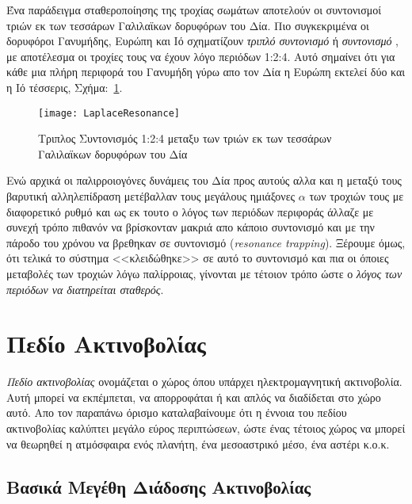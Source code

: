 \newpage

Ένα παράδειγμα σταθεροποίησης της τροχίας σωμάτων αποτελούν οι συντονισμοί τριών εκ των τεσσάρων Γαλιλαϊκων δορυφόρων του Δία. Πιο συγκεκριμένα οι δορυφόροι Γανυμήδης, Ευρώπη και Ιό σχηματίζουν {\it τριπλό συντονισμό} ή {\it συντονισμό} {}, με αποτέλεσμα οι τροχίες τους να έχουν λόγο περιόδων 1:2:4. Αυτό σημαίνει ότι για κάθε μια πλήρη περιφορά του Γανυμήδη γύρω απο τον Δία η Ευρώπη εκτελεί δύο και η Ιό τέσσερις, Σχήμα:~\ref{fig:LaplaceResonance}.

\begin{figure}[h!]
  \centering
  \texttt{[image: LaplaceResonance]}
  \gr
  \caption{Τριπλος Συντονισμός 1:2:4 μεταξυ των τριών εκ των τεσσάρων Γαλιλαϊκων δορυφόρων του Δία }\label{fig:LaplaceResonance}
\end{figure}

Ενώ αρχικά οι παλιρροιογόνες δυνάμεις του Δία προς αυτούς αλλα και η μεταξύ τους βαρυτική αλληλεπίδραση μετέβαλλαν τους μεγάλους ημιάξονες $\alpha$  των τροχιών τους με διαφορετικό ρυθμό και ως εκ τουτο ο λόγος των περιόδων περιφοράς άλλαζε με συνεχή τρόπο πιθανόν να βρίσκονταν μακριά απο κάποιο συντονισμό και με την πάροδο του χρόνου να βρεθηκαν σε συντονισμό {\en({\it resonance trapping})}. Ξέρουμε όμως\cite[{\en Chap.~1, Sect.~1.8}]{tausigmaiotagammaacutealphanuetavarsigma2015pilambdaalphanuetatauiotakappaacutealpha}, ότι τελικά το σύστημα <<κλειδώθηκε>> σε αυτό το συντονισμό και πια οι όποιες μεταβολές των τροχιών λόγω παλίρροιας, γίνονται με τέτοιον τρόπο ώστε ο {\it λόγος των περιόδων να διατηρείται σταθερός}.
 


\newpage
\section{Πεδίο Ακτινοβολίας}

{\it Πεδίο ακτινοβολίας} ονομάζεται ο χώρος όπου υπάρχει ηλεκτρομαγνητική ακτινοβολία. Αυτή μπορεί να εκπέμπεται, να απορροφάται ή και απλός να διαδίδεται στο χώρο αυτό. Απο τον παραπάνω όρισμο καταλαβαίνουμε ότι η έννοια του πεδίου ακτινοβολίας καλύπτει μεγάλο εύρος περιπτώσεων, ώστε ένας τέτοιος χώρος να μπορεί να θεωρηθεί η ατμόσφαιρα ενός πλανήτη, ένα μεσοαστρικό μέσο, ένα αστέρι κ.ο.κ.

 \subsection{Βασικά Μεγέθη Διάδοσης Ακτινοβολίας}
 

